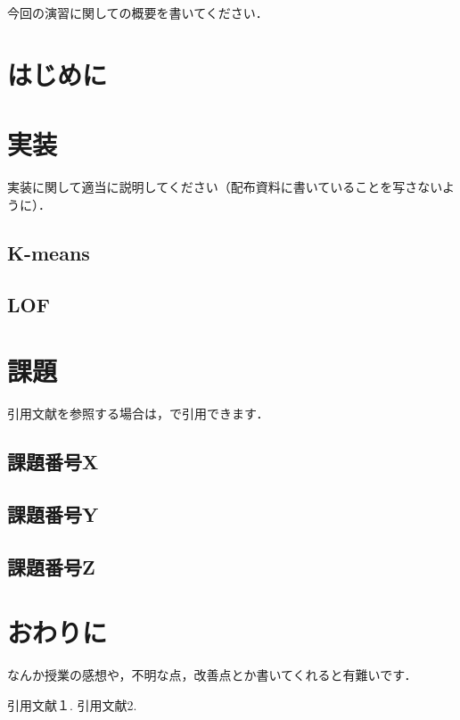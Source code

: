\documentclass{report}
\begin{document}
\pagestyle{empty}
\begin{jabstract}
今回の演習に関しての概要を書いてください．
\end{jabstract}

\maketitle

\section{はじめに}

\section{実装}

実装に関して適当に説明してください（配布資料に書いていることを写さないように）．

\subsection{K-means}

\subsection{LOF}

\section{課題}

引用文献を参照する場合は，\cite{test1}で引用できます．

\subsection{課題番号X}

\subsection{課題番号Y}

\subsection{課題番号Z}

\section{おわりに}
なんか授業の感想や，不明な点，改善点とか書いてくれると有難いです．

\begin{thebibliography}{99}
 引用文献１.
引用文献2.
\end{thebibliography}
\end{document}
